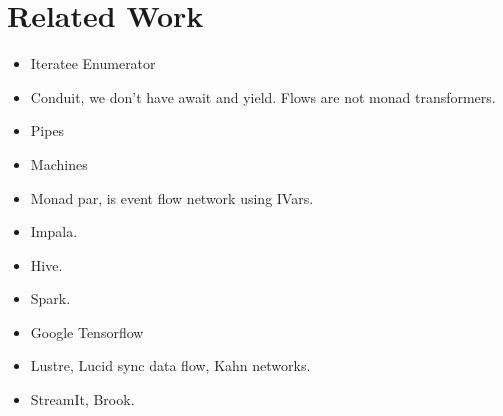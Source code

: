 \section{Related Work}

\begin{itemize}
\item Iteratee Enumerator
\item Conduit, we don't have await and yield. Flows are not monad transformers.
\item Pipes
\item Machines
\item Monad par, is event flow network using IVars.
\item Impala.
\item Hive.
\item Spark.
\item Google Tensorflow
\item Lustre, Lucid sync data flow, Kahn networks.
\item StreamIt, Brook.
\end{itemize}


